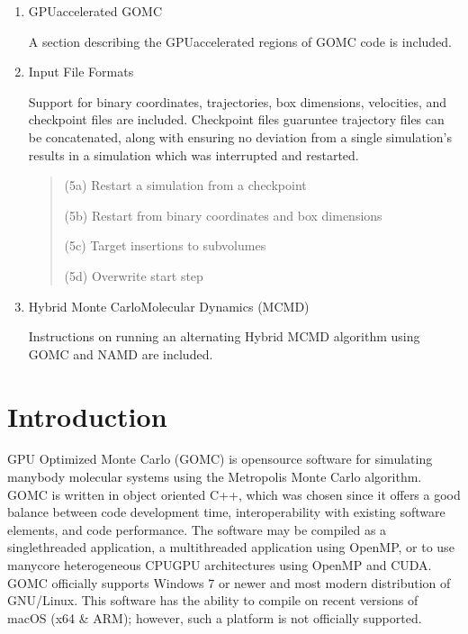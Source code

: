 \documentclass[letterpaper,10pt,english]{sphinxmanual}
\begin{document}
\begin{enumerate}
\item {} 
\sphinxAtStartPar
GPU\sphinxhyphen{}accelerated GOMC

\sphinxAtStartPar
A section describing the GPU\sphinxhyphen{}accelerated regions of GOMC code is included.

\item {} 
\sphinxAtStartPar
Input File Formats

\sphinxAtStartPar
Support for binary coordinates, trajectories, box dimensions, velocities, and checkpoint files are included.  Checkpoint files guaruntee trajectory files can be concatenated, along with ensuring no deviation from a single simulation’s results in a simulation which was interrupted and restarted.
\begin{quote}

\sphinxAtStartPar
(5a) Restart a simulation from a checkpoint

\sphinxAtStartPar
(5b) Restart from binary coordinates and box dimensions

\sphinxAtStartPar
(5c) Target insertions to subvolumes

\sphinxAtStartPar
(5d) Overwrite start step
\end{quote}

\item {} 
\sphinxAtStartPar
Hybrid Monte Carlo\sphinxhyphen{}Molecular Dynamics (MCMD)

\sphinxAtStartPar
Instructions on running an alternating Hybrid MCMD algorithm using GOMC and NAMD are included.

\end{enumerate}


\chapter{Introduction}
\label{\detokenize{introduction:introduction}}\label{\detokenize{introduction::doc}}
\sphinxAtStartPar
GPU Optimized Monte Carlo (GOMC) is open\sphinxhyphen{}source software for simulating many\sphinxhyphen{}body molecular systems using the Metropolis Monte Carlo algorithm. GOMC is written in object oriented C++, which was chosen since it offers a good balance between code development time, interoperability with existing software elements, and code performance. The software may be compiled as a single\sphinxhyphen{}threaded application, a multi\sphinxhyphen{}threaded application using OpenMP, or to use many\sphinxhyphen{}core heterogeneous CPU\sphinxhyphen{}GPU architectures using OpenMP and CUDA. GOMC officially supports Windows 7 or newer and most modern distribution of GNU/Linux. This software has the ability to compile on recent versions of macOS (x64 \& ARM); however, such a platform is not officially supported.
\end{document}
